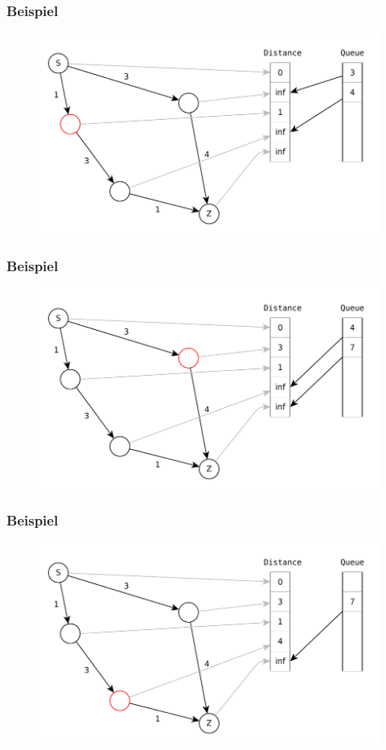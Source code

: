 \begin{frame}
\frametitle{Beispiel}
\begin{figure}
\includegraphics[scale=.8]{dijkstra_graphs/dijkstra_4.pdf}
\end{figure}
\end{frame}

\begin{frame}
\frametitle{Beispiel}
\begin{figure}
\includegraphics[scale=.8]{dijkstra_graphs/dijkstra_5.pdf}
\end{figure}
\end{frame}

\begin{frame}
\frametitle{Beispiel}
\begin{figure}
\includegraphics[scale=.8]{dijkstra_graphs/dijkstra_6.pdf}
\end{figure}
\end{frame}

